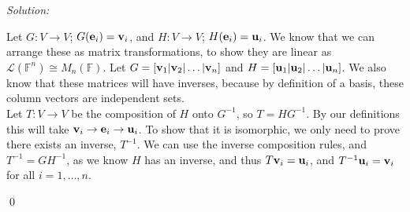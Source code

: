 \documentclass[11 pt]{article}
\newenvironment{sol}
    {\emph{Solution:}
    }
    {
    \qed
    }
\theoremstyle{definition}
\newcommand{\F}{\mathbb{F}} %
\newcommand{\vv}[1]{\textbf v_{#1}}
\newcommand{\vu}[1]{\textbf u_{#1}}
\newcommand{\ve}[1]{\textbf e_{#1}}
\begin{document}
\begin{sol}
Let $G:V\to V$; $G(\ve{i})=\vv{i}$, and $H:V\to V$; $H(\ve{i})=\vu{i}$. We know that we can arrange these as matrix transformations, to show they are linear as $\mathcal{L}(\F^n)\cong M_{n}(\F)$. Let $G=[\vv{1}|\vv{2}|\dots|\vv{n}]$ and $H=[\vu{1}|\vu{2}|\dots|\vu{n}]$. We also know that these matrices will have inverses, because by definition of a basis, these column vectors are independent sets.\\
Let $T:V\to V$ be the composition of $H$ onto $G^{-1}$, so $T=HG^{-1}$. By our definitions this will take $\vv{i}\to\ve{i}\to\vu{i}$. To show that it is isomorphic, we only need to prove there exists an inverse, $T^{-1}$. We can use the inverse composition rules, and $T^{-1}=GH^{-1}$, as we know $H$ has an inverse, and thus $T\vv{i}=\vu{i}$, and $T^{-1}\vu{i}=\vv{i}$ for all $i=1,\dots,n$.
\end{sol}
\end{document}
